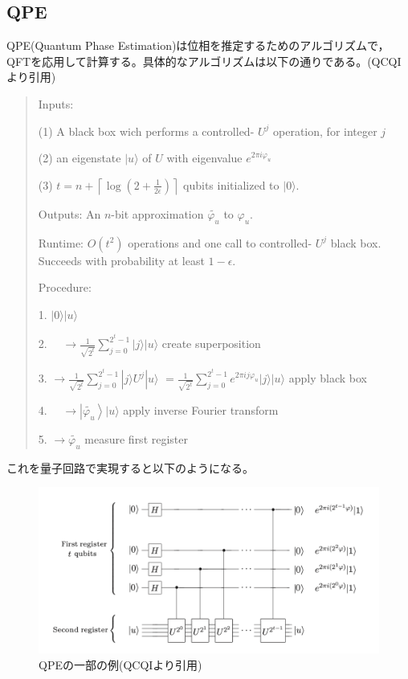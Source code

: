 \documentclass[b5paper,papersize,dvipdfmx,fleqn]{jsarticle}
\begin{document}
\subsection{QPE}
QPE(Quantum Phase Estimation)は位相を推定するためのアルゴリズムで，QFTを応用して計算する。具体的なアルゴリズムは以下の通りである。(QCQIより引用)
\begin{quote}

  Inputs:

   (1) A black box wich performs a controlled- $U^{j}$ operation, for integer $j$

   (2) an eigenstate $|u\rangle$ of $U$ with eigenvalue $e^{2 \pi i \varphi_{u}}$

   (3) $t=n+\left\lceil\log \left(2+\frac{1}{2 \epsilon}\right)\right\rceil$ qubits initialized to $|0\rangle$.


  Outputs: An $n$-bit approximation $\widetilde{\varphi_{u}}$ to $\varphi_{u} .$


  Runtime: $O\left(t^{2}\right)$ operations and one call to controlled- $U^{j}$ black box. Succeeds with probability at least $1-\epsilon$.


  Procedure:


  1. $|0\rangle|u\rangle$


  2. $\quad \rightarrow \frac{1}{\sqrt{2^{t}}} \sum_{j=0}^{2^{t}-1}|j\rangle|u\rangle$ create superposition


  3. $\rightarrow \frac{1}{\sqrt{2^{t}}} \sum_{j=0}^{2^{t}-1}|j\rangle U^{j}|u\rangle$ $=\frac{1}{\sqrt{2^{t}}} \sum_{j=0}^{2^{t}-1} e^{2 \pi i j \varphi_{u}}|j\rangle|u\rangle$ apply black box


  4. $\quad \rightarrow\left|\widetilde{\varphi_{u}}\right\rangle|u\rangle$ apply inverse Fourier transform


  5. $\rightarrow \widetilde{\varphi_{u}}$ measure first register
\end{quote}


これを量子回路で実現すると以下のようになる。
\begin{center}
  \begin{figure}[H]
       \includegraphics[width=\textwidth]{qpe.pdf}
       \caption{QPEの一部の例(QCQIより引用)}
       \label{circuit}
  \end{figure}
\end{center}
\end{document}
